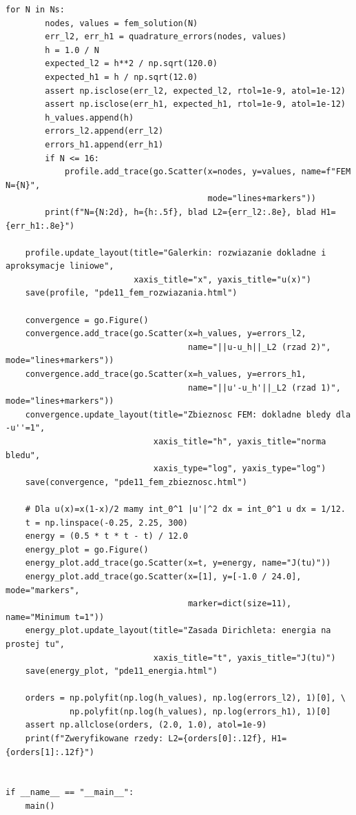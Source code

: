 \begin{lstlisting}[style=pythonpde,caption={Galerkin, błędy i funkcjonał energii (Plotly)},label={code:pde11-galerkin}]
    for N in Ns:
        nodes, values = fem_solution(N)
        err_l2, err_h1 = quadrature_errors(nodes, values)
        h = 1.0 / N
        expected_l2 = h**2 / np.sqrt(120.0)
        expected_h1 = h / np.sqrt(12.0)
        assert np.isclose(err_l2, expected_l2, rtol=1e-9, atol=1e-12)
        assert np.isclose(err_h1, expected_h1, rtol=1e-9, atol=1e-12)
        h_values.append(h)
        errors_l2.append(err_l2)
        errors_h1.append(err_h1)
        if N <= 16:
            profile.add_trace(go.Scatter(x=nodes, y=values, name=f"FEM N={N}",
                                         mode="lines+markers"))
        print(f"N={N:2d}, h={h:.5f}, blad L2={err_l2:.8e}, blad H1={err_h1:.8e}")

    profile.update_layout(title="Galerkin: rozwiazanie dokladne i aproksymacje liniowe",
                          xaxis_title="x", yaxis_title="u(x)")
    save(profile, "pde11_fem_rozwiazania.html")

    convergence = go.Figure()
    convergence.add_trace(go.Scatter(x=h_values, y=errors_l2,
                                     name="||u-u_h||_L2 (rzad 2)", mode="lines+markers"))
    convergence.add_trace(go.Scatter(x=h_values, y=errors_h1,
                                     name="||u'-u_h'||_L2 (rzad 1)", mode="lines+markers"))
    convergence.update_layout(title="Zbieznosc FEM: dokladne bledy dla -u''=1",
                              xaxis_title="h", yaxis_title="norma bledu",
                              xaxis_type="log", yaxis_type="log")
    save(convergence, "pde11_fem_zbieznosc.html")

    # Dla u(x)=x(1-x)/2 mamy int_0^1 |u'|^2 dx = int_0^1 u dx = 1/12.
    t = np.linspace(-0.25, 2.25, 300)
    energy = (0.5 * t * t - t) / 12.0
    energy_plot = go.Figure()
    energy_plot.add_trace(go.Scatter(x=t, y=energy, name="J(tu)"))
    energy_plot.add_trace(go.Scatter(x=[1], y=[-1.0 / 24.0], mode="markers",
                                     marker=dict(size=11), name="Minimum t=1"))
    energy_plot.update_layout(title="Zasada Dirichleta: energia na prostej tu",
                              xaxis_title="t", yaxis_title="J(tu)")
    save(energy_plot, "pde11_energia.html")

    orders = np.polyfit(np.log(h_values), np.log(errors_l2), 1)[0], \
             np.polyfit(np.log(h_values), np.log(errors_h1), 1)[0]
    assert np.allclose(orders, (2.0, 1.0), atol=1e-9)
    print(f"Zweryfikowane rzedy: L2={orders[0]:.12f}, H1={orders[1]:.12f}")


if __name__ == "__main__":
    main()
\end{lstlisting}

